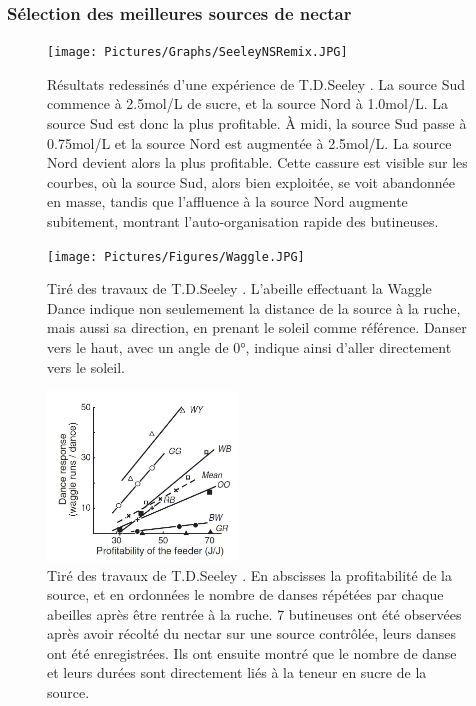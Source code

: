 			\subsubsection{Sélection des meilleures sources de nectar}
			
			\begin{figure}
			\centering
			\texttt{[image: Pictures/Graphs/SeeleyNSRemix.JPG]}
				\caption{Résultats redessinés d'une expérience de T.D.Seeley \cite{seeley_collective_1991}. La source Sud
commence à 2.5mol/L de sucre, et la source Nord à 1.0mol/L. La source Sud est
donc la plus profitable. À midi, la source Sud
passe à 0.75mol/L et la source Nord est augmentée à 2.5mol/L. La source Nord devient alors la plus profitable.
Cette cassure est visible sur les courbes, où la source Sud, alors bien exploitée, se voit abandonnée en masse, tandis que l’affluence à la source Nord augmente subitement, montrant l’auto-organisation rapide des butineuses.}
			\label{SeeleyNS}
			\end{figure}
			
			\begin{figure}
			\centering
			\texttt{[image: Pictures/Figures/Waggle.JPG]}
				\caption{Tiré des travaux de T.D.Seeley \cite{seeley_wisdom_1995}. L'abeille effectuant la Waggle Dance indique non seulemement la distance de la source à la ruche, mais aussi sa direction, en prenant le soleil comme référence. Danser vers le haut, avec un angle de 0°, indique ainsi d'aller directement vers le soleil.}
			\label{Waggle}
			\end{figure}
			
			
	\begin{figure}
	\centering
	\includegraphics[width=0.45\textwidth]{Pictures/Graphs/SeeleyWaggles.JPG}
	\caption{Tiré des travaux de T.D.Seeley \cite{seeley_wisdom_1995}. En abscisses la profitabilité de la source, et en ordonnées le nombre de danses répétées par chaque abeilles après être rentrée à la ruche. 7 butineuses ont été observées après avoir récolté du nectar sur une source contrôlée, leurs danses ont été enregistrées. Ils ont ensuite montré que le nombre de danse et leurs durées sont directement liés à la teneur en sucre de la source.}
	\label{SeeleyWaggles}
	\end{figure}
	
